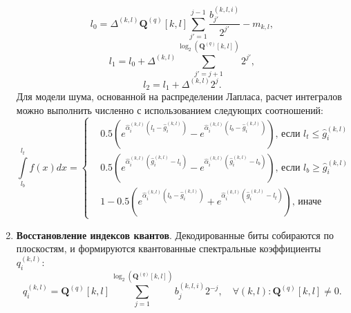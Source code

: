 \begin{enumerate}
  \begin{equation*}
  l_0 = \Delta^{(k,l)} \mathbf{Q}^{(q)}[k,l] \sum\limits_{j'=1}^{j-1} \frac{b_{j'}^{(k,l,i)}}{2^{j'}} - m_{k,l},
  \end{equation*}
  \begin{equation*}
  l_1 = l_0 + \Delta^{(k,l)} \sum\limits_{j'=j+1}^{\log_2\left(\mathbf{Q}^{(q)}[k,l]\right)}2^{j'},
  \end{equation*}
  \begin{equation*}
  l_2 = l_1 + \Delta^{(k,l)} 2^j.
  \end{equation*}
  Для модели шума, основанной на распределении Лапласа, расчет интегралов можно выполнить численно с использованием следующих соотношений:
  \begin{equation*}
  \int\limits_{l_b}^{l_t} f(x) dx = \begin{cases}
  & 0.5 \left( e^{\hat{\alpha}_i^{(k,l)}(l_t-\hat{g}_i^{(k,l)})} - e^{\hat{\alpha}_i^{(k,l)}(l_b - \hat{g}_i^{(k,l)})} \right) \text{, если $l_t \leq \hat{g}_i^{(k,l)}$ } \\
  & 0.5 \left( e^{\hat{\alpha}_i^{(k,l)}(\hat{g}_i^{(k,l)} - l_t)} - e^{\hat{\alpha}_i^{(k,l)}(\hat{g}_i^{(k,l)} - l_b)} \right) \text{, если $l_b \geq \hat{g}_i^{(k,l)}$ } \\
  & 1 - 0.5 \left( e^{\hat{\alpha}_i^{(k,l)}(l_b-\hat{g}_i^{(k,l)})} + e^{\hat{\alpha}_i^{(k,l)}(\hat{g}_i^{(k,l)}-l_t)} \right)\text{, иначе}
  \end{cases}
  \end{equation*}

  \item \textbf{Восстановление индексов квантов}. Декодированные биты собираются по плоскостям, и формируются квантованные спектральные коэффициенты $q^{(k,l)}_i$:
  \begin{equation*}
  q^{(k,l)}_i = \mathbf{Q}^{(q)}[k,l] \sum\limits_{j=1}^{\log_2\left(\mathbf{Q}^{(q)}[k,l]\right)} b_{j}^{(k,l,i)}2^{-j}, \quad \forall (k,l) : \mathbf{Q}^{(q)}[k,l] \neq 0.
  \end{equation*}


\end{enumerate}
